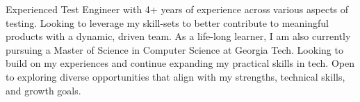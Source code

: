 

\begin{cvparagraph} Experienced Test Engineer with 4+ years of experience across various aspects of testing. Looking to leverage my skill-sets to better contribute to meaningful products with a dynamic, driven team. As a life-long learner, I am also currently pursuing a Master of Science in Computer Science at Georgia Tech. Looking to build on my experiences and continue expanding my practical skills in tech. Open to exploring diverse opportunities that align with my strengths, technical skills, and growth goals.


\end{cvparagraph}
